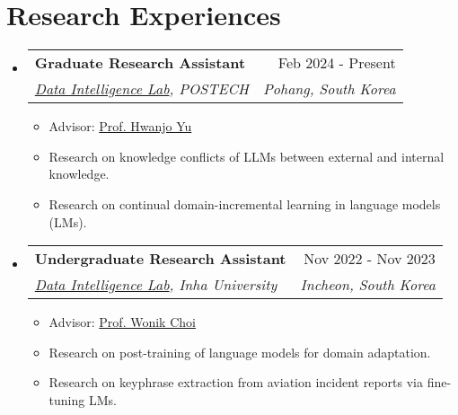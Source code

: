 \documentclass[letterpaper,11pt]{article}
\makeatletter
\newcommand{\resumeSubheading}[4]{
  \vspace{-1pt}\item
    \begin{tabular*}{0.97\textwidth}{l@{\extracolsep{\fill}}r}
      #1 & #2 \\
      \textit{\small#3} & \textit{\small #4} \\
    \end{tabular*}\vspace{-5pt}
}
\makeatother
\begin{document}
    \section{Research Experiences}
    \begin{itemize}[leftmargin=*,label=]

        \resumeSubheading
        {\textbf{Graduate Research Assistant} }{Feb 2024 - Present}
            {\href{https://sites.google.com/view/postechdi/home}{Data Intelligence Lab}, POSTECH}{Pohang, South Korea}
            \begin{itemize}[label=\bullet]
                \item Advisor: \href{https://sites.google.com/view/postechdi/member/faculty}{Prof. Hwanjo Yu}
                \item Research on knowledge conflicts of LLMs between external and internal knowledge.
                \item Research on continual domain-incremental learning in language models (LMs).
            \end{itemize}
            
            
        \resumeSubheading
        {\textbf{Undergraduate Research Assistant} }{Nov 2022 - Nov 2023}
            {\href{http://dilab.inha.ac.kr/}{Data Intelligence Lab}, Inha University}{Incheon, South Korea}
            \begin{itemize}[label=\bullet]
                \item{Advisor: \href{http://bit.ly/3zSrQ8F}{Prof. Wonik Choi}}
                \item{Research on post-training of language models for domain adaptation.}
                \item{Research on keyphrase extraction from aviation incident reports via fine-tuning LMs.}
            \end{itemize}
            

\end{itemize}
\end{document}
